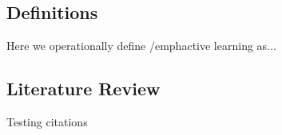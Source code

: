 \documentclass{LSRIarticle}
\begin{document}
\subsection{Definitions}
Here we operationally define /emph{active learning} as... 


\subsection{Literature Review}
Testing citations \parencite{}



\end{document}
